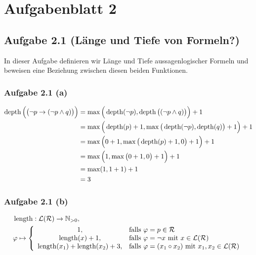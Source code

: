 
\section{Aufgabenblatt 2}
\subsection{Aufgabe 2.1 (Länge und Tiefe von Formeln?)}
In dieser Aufgabe definieren wir Länge und Tiefe aussagenlogischer Formeln und beweisen eine Beziehung zwischen diesen beiden Funktionen.

\subsubsection{Aufgabe 2.1 (a)}
\begin{align*}
	\operatorname{depth}\Big(\big(\neg p\to(\neg p\wedge q)\big)\Big)
	&=\max\Big(\operatorname{depth}(\neg p),\operatorname{depth}\big((\neg p\wedge q)\big)\Big)+1\\
	&=\max\Big(\operatorname{depth}(p)+1,\max\big(\operatorname{depth}(\neg p),\operatorname{depth}(q)\big)+1\Big)+1\\
	&=\max\Big(0+1,\max\big(\operatorname{depth}(p)+1,0\big)+1\Big)+1\\
	&=\max\Big(1,\max\big(0+1,0\big)+1\Big)+1\\
	&=\max(1,1+1)+1\\
	&=3
\end{align*}

\subsubsection{Aufgabe 2.1 (b)}
\begin{align*}
	&\length:\mathcal{L}(\mathcal{R})\to\N_{>0},\qquad\\
	&\varphi\mapsto\left\lbrace\begin{array}{cl}
		1, & \falls \varphi=p\in\mathcal{R}\\
		\length(x) + 1, & \falls \varphi=\neg x\mit x\in\mathcal{L}(\mathcal{R})\\
		\length(x_1) + \length(x_2) + 3, & \falls \varphi=(x_1\circ x_2)\mit x_1,x_2\in\mathcal{L}(\mathcal{R})%
	\end{array}\right.
\end{align*}

